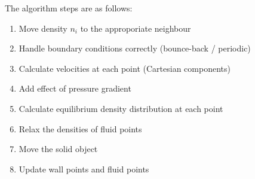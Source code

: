 The algorithm steps are as follows:
\begin{multicols}{2}
\begin{enumerate}
    \item Move density $n_i$ to the approporiate neighbour
    \item Handle boundary conditions correctly (bounce-back / periodic)
    \item Calculate velocities at each point (Cartesian components)
    \item Add effect of pressure gradient
    \item Calculate equilibrium density distribution at each point
    \item Relax the densities of fluid points
    \item Move the solid object
    \item Update wall points and fluid points
\end{enumerate}
\end{multicols}